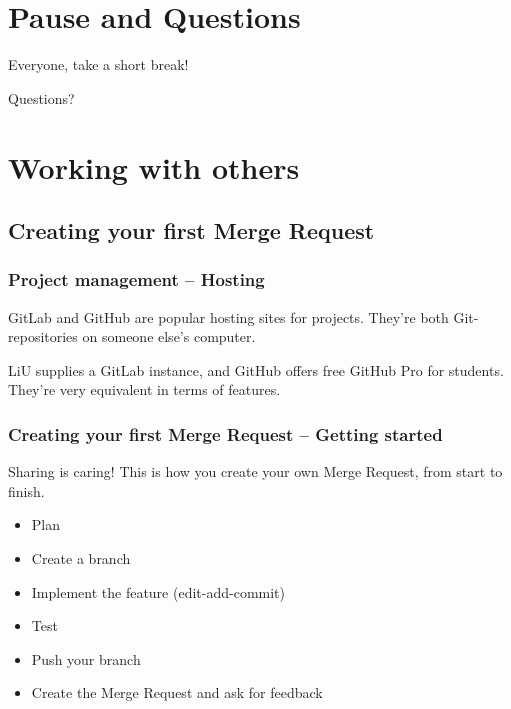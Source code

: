 \documentclass{beamer}
\begin{document}
\section{Pause and Questions}

\begin{frame}[fragile]
  \begin{center}
    Everyone, take a short break!
  \end{center}
\end{frame}

\begin{frame}[fragile]
  \begin{center}
    Questions?
  \end{center}
\end{frame}

\section{Working with others}
\subsection{Creating your first Merge Request}

\begin{frame}[fragile]
  \frametitle{Project management -- Hosting}
  \vspace{1em}

  GitLab and GitHub are popular hosting sites for projects.
  They're both Git-repositories on someone else's computer.
  \vspace{1em}

  LiU supplies a GitLab instance, and GitHub offers free GitHub Pro for students.
  They're very equivalent in terms of features.

\end{frame}

\begin{frame}[fragile]
  \frametitle{Creating your first Merge Request -- Getting started}
  Sharing is caring! This is how you create your own Merge Request, from start
  to finish.
  \pause{}
  \begin{itemize}[<+->]
    \item Plan
    \item Create a branch
    \item Implement the feature (edit-add-commit)
    \item Test
    \item Push your branch
    \item Create the Merge Request and ask for feedback
  \end{itemize}
\end{frame}
\end{document}
